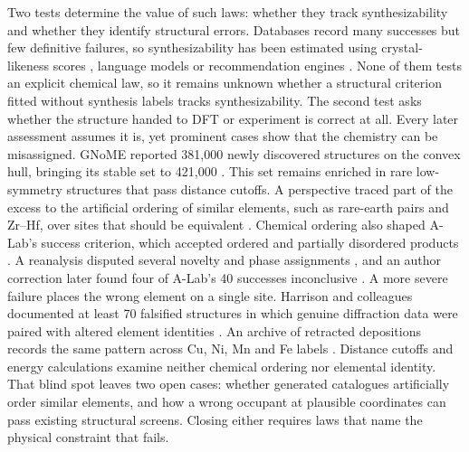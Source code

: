 Two tests determine the value of such laws: whether they track synthesizability and whether
they identify structural errors. Databases record many successes but few definitive
failures, so synthesizability has been estimated using crystal-likeness scores
\cite{jang2020structure}, language models \cite{song2025llm} or recommendation engines
\cite{griesemer2025wideranging}. None of them tests an explicit chemical law, so it remains unknown whether a structural
criterion fitted without synthesis labels tracks synthesizability.
The second test asks whether the structure handed to DFT or experiment is correct
at all. Every later assessment assumes it is, yet prominent cases show that the chemistry
can be misassigned.
GNoME reported 381{,}000 newly discovered structures on the convex hull, bringing its stable
set to 421{,}000 \cite{merchant2023scaling}. This set remains enriched in rare
low-symmetry structures that pass distance cutoffs. A perspective traced part of the excess
to the artificial ordering of similar elements, such as rare-earth pairs and Zr--Hf,
over sites that should be equivalent \cite{cheetham2024artificial,smit2026dataonly}. Chemical
ordering also shaped A-Lab's success criterion, which accepted ordered and partially
disordered products \cite{szymanski2023autonomous}. A reanalysis disputed several novelty
and phase assignments \cite{leeman2024challenges}, and an author correction later found
four of A-Lab's 40 successes inconclusive \cite{szymanski2026correction}.
A more severe failure places the wrong element on a single site. Harrison and colleagues
documented at least 70 falsified structures in which genuine diffraction data were paired
with altered element identities \cite{harrison2010falsified}. An archive of retracted
depositions records the same pattern across Cu, Ni, Mn and Fe labels
\cite{iucr2012retraction}. Distance cutoffs and energy calculations examine neither
chemical ordering nor elemental identity. That blind spot leaves two open cases: whether generated catalogues artificially order
similar elements, and how a wrong occupant at plausible coordinates can pass existing
structural screens. Closing either requires laws that name the physical constraint that fails.

